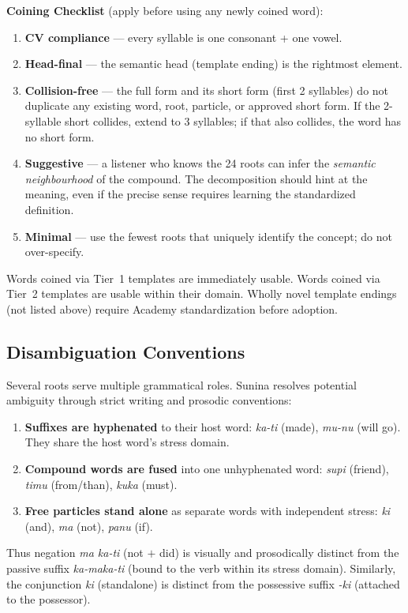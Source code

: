 \documentclass[12pt, a4paper]{article}
\begin{document}
\vspace{0.3em}
\noindent\textbf{Coining Checklist} (apply before using any newly coined word):
\begin{enumerate}
    \item \textbf{CV compliance} --- every syllable is one consonant + one vowel.
    \item \textbf{Head-final} --- the semantic head (template ending) is the rightmost element.
    \item \textbf{Collision-free} --- the full form and its short form (first 2 syllables) do not duplicate any existing word, root, particle, or approved short form. If the 2-syllable short collides, extend to 3 syllables; if that also collides, the word has no short form.
    \item \textbf{Suggestive} --- a listener who knows the 24 roots can infer the \textit{semantic neighbourhood} of the compound. The decomposition should hint at the meaning, even if the precise sense requires learning the standardized definition.
    \item \textbf{Minimal} --- use the fewest roots that uniquely identify the concept; do not over-specify.
\end{enumerate}
Words coined via Tier~1 templates are immediately usable. Words coined via Tier~2 templates are usable within their domain. Wholly novel template endings (not listed above) require Academy standardization before adoption.

\subsection{Disambiguation Conventions}
Several roots serve multiple grammatical roles. Sunina resolves potential ambiguity through strict writing and prosodic conventions:
\begin{enumerate}
    \item \textbf{Suffixes are hyphenated} to their host word: \textit{ka-ti} (made), \textit{mu-nu} (will go). They share the host word's stress domain.
    \item \textbf{Compound words are fused} into one unhyphenated word: \textit{supi} (friend), \textit{timu} (from/than), \textit{kuka} (must).
    \item \textbf{Free particles stand alone} as separate words with independent stress: \textit{ki} (and), \textit{ma} (not), \textit{panu} (if).
\end{enumerate}
Thus negation \textit{ma ka-ti} (not $+$ did) is visually and prosodically distinct from the passive suffix \textit{ka-maka-ti} (bound to the verb within its stress domain). Similarly, the conjunction \textit{ki} (standalone) is distinct from the possessive suffix \textit{-ki} (attached to the possessor).
\end{document}
